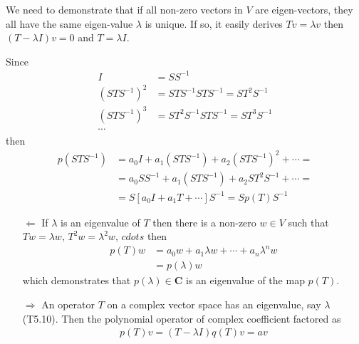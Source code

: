 \exo{} We need to demonstrate that if all non-zero vectors in $V$ are eigen-vectors, they all have the same eigen-value $\lambda$ is unique. If so, it easily derives $Tv=\lambda v$ then $(T-\lambda I) v = 0$ and $T=\lambda I$. 


\exo{}

\exo{} Since
\begin{align*}
I  &= SS^{-1} \\
(STS^{-1})^2 &= STS^{-1}STS^{-1} = ST^2S^{-1} \\
(STS^{-1})^3 &= ST^2S^{-1}STS^{-1} = ST^3S^{-1} \\
\cdots
\end{align*}
then
\begin{align*}
p(STS^{-1}) &= a_0I+a_1(STS^{-1})+a_2(STS^{-1})^2 + \cdots = \\
            &= a_0 SS^{-1} + a_1(STS^{-1}) +a_2 ST^2S^{-1}+ \cdots = \\
            &= S\left[  a_0I+a_1T + \cdots  \right] S^{-1} = 
            Sp(T)S^{-1}
\end{align*}
\exo{}
\begin{enumerate}
\item[$\Leftarrow$] If $\lambda$ is an eigenvalue of $T$ then there is a non-zero $w\in V$ such that $Tw= \lambda w$, $T^2w=\lambda^2w$, $cdots$ then
\begin{align*}
p(T)w &=a_0w + a_1 \lambda w + \cdots + a_n\lambda^nw \\
&= p(\lambda)w
\end{align*}
which demonstrates that $p(\lambda)\in\mathbf{C}$ is an eigenvalue of the map $p(T)$.
\item[$\Rightarrow$] An operator $T$ on a complex vector space has an eigenvalue, say $\lambda$ (T5.10). Then the polynomial operator of complex coefficient factored as
\begin{align*}
p(T)v = (T-\lambda I)q(T)v = av
\end{align*}
\end{enumerate}
\exo{}
